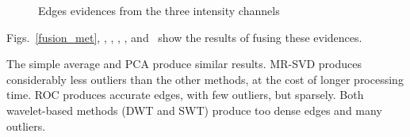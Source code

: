 \documentclass[journal]{IEEEtran}
\begin{document}
   \begin{figure}[hbt]
	\centering
     \caption{Edges evidences from the three intensity channels}
     \label{evidencias_hh_hv_vv} 
   \end{figure}

Figs.~\ref{fusion_met}, , , , , and~ show the results of fusing these evidences. 


The simple average and PCA produce similar results.
MR-SVD produces considerably less outliers than the other methods, at the cost of longer processing time.
ROC produces accurate edges, with few outliers, but sparsely. 
Both wavelet-based methods (DWT and SWT) produce too dense edges and many outliers.
\end{document}
